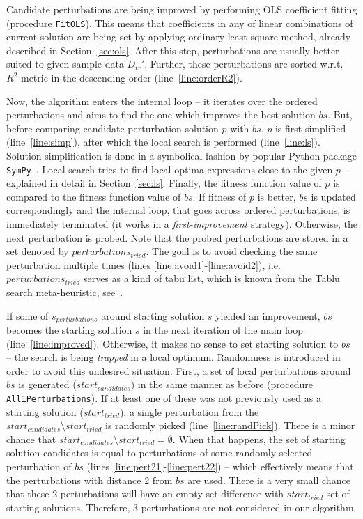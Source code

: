 \documentclass{bmcart}
\begin{document}
Candidate perturbations are being improved by performing OLS coefficient fitting (procedure \texttt{FitOLS}). This means that coefficients in any of linear combinations of current solution are being set by applying  ordinary least square method, already described in Section~\ref{sec:ols}. 
After this step, perturbations are usually better suited to given sample data $D_{tr}'$. 
Further, these perturbations are sorted w.r.t. $R^2$ metric in the descending order (line~\ref{line:orderR2}). 

Now, the algorithm enters the internal loop -- it iterates over the ordered perturbations and aims to find the one which improves the best solution $bs$. But, before comparing candidate perturbation solution $p$ with $bs$, $p$ is first simplified (line~\ref{line:simp}), after which the local search is performed (line~\ref{line:ls}).
Solution simplification is done in a symbolical fashion by popular  Python package \texttt{SymPy}~\cite{sympy}.
Local search tries to find local optima expressions close to the given $p$ -- explained in detail in Section~\ref{sec:ls}.  
Finally, the fitness function value of $p$ is compared to the fitness function value of $bs$. If fitness of $p$ is better, $bs$ is updated correspondingly and the internal loop, that goes across ordered perturbations, is immediately terminated (it works in a  \emph{first-improvement} strategy). Otherwise, the next perturbation is probed. 
Note that the probed perturbations are stored in a set denoted by $perturbations_{tried}$. The goal is to avoid checking the same perturbation multiple times (lines \ref{line:avoid1}-\ref{line:avoid2}), i.e. $perturbations_{tried}$ serves as a kind of tabu list, which is known from the Tablu search meta-heuristic, see~\cite{glover1998tabu}.    


If some of $s_{perturbations}$ around starting solution $s$ yielded an improvement, $bs$ becomes the starting solution $s$ in the next iteration of the main loop (line~\ref{line:improved}). 
Otherwise, it makes no sense to set starting solution to $bs$ -- the search is being  \emph{trapped} in a local optimum. Randomness is introduced in order to avoid this undesired situation. First, a set of local perturbations around $bs$ is generated ($start_{candidates}$) in the same manner as before (procedure \texttt{All1Perturbations}). If at least one of these was not previously used as a starting solution ($start_{tried}$), a single perturbation from the $start_{candidates} \setminus start_{tried}$ is randomly picked (line~\ref{line:randPick}). There is a minor chance that $start_{candidates} \setminus start_{tried} = \emptyset$. When that happens, the set of starting solution candidates is equal to perturbations of some randomly selected perturbation of $bs$ (lines \ref{line:pert21}-\ref{line:pert22}) -- which effectively means that the perturbations with distance 2 from $bs$ are used. There is a very small chance that these 2-perturbations will have an empty set difference with $start_{tried}$ set of starting solutions. Therefore, 3-perturbations are not considered in our algorithm. 
\end{document}
